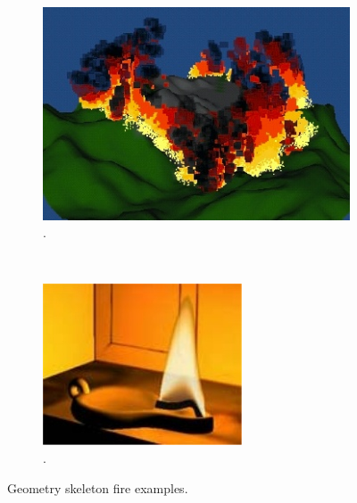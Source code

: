 \begin{figure}[htpb!]
        \centering
        \begin{subfigure}[t]{0.41\textwidth}
                \includegraphics[width=\textwidth]{img/lee_2001}
                \caption{\cite{Lee:2001}.}
        \end{subfigure}%
        ~ %
        \begin{subfigure}[t]{0.36\textwidth}
                \includegraphics[width=\textwidth]{img/bridault_2006}
                \caption{\cite{Bridault:2006}.}
        \end{subfigure}          
        \caption{Geometry skeleton fire examples.}
        \label{fig:geometry_skeleton}
\end{figure}

